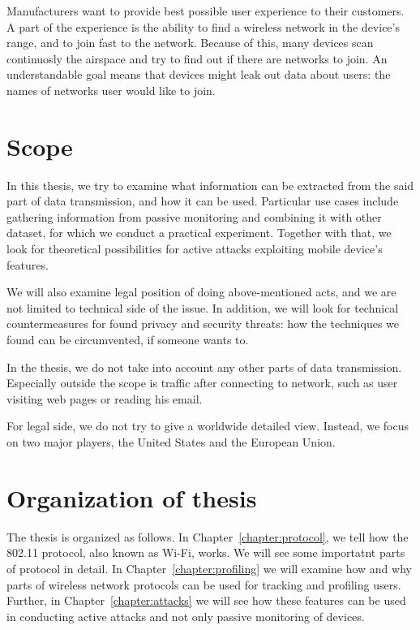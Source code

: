 \documentclass[12pt,a4paper,oneside,pdftex]{report}
\begin{document}
Manufacturers want to provide best possible user experience to their customers. A part of the experience is the ability to find a wireless network in the device's range, and to join fast to the network. Because of this, many devices scan continuosly the airspace and try to find out if there are networks to join. An understandable goal means that devices might leak out data about users: the names of networks user would like to join.


\section{Scope}
\label{sec:scope}

In this thesis, we try to examine what information can be extracted from the said part of data transmission, and how it can be used. Particular use cases include gathering information from passive monitoring and combining it with other dataset, for which we conduct a practical experiment. Together with that, we look for theoretical possibilities for active attacks exploiting mobile device's features.

We will also examine legal position of doing above-mentioned acts, and we are not limited to technical side of the issue. In addition, we will look for technical countermeasures for found privacy and security threats: how the techniques we found can be circumvented, if someone wants to. 

In the thesis, we do not take into account any other parts of data transmission. Especially outside the scope is traffic after connecting to network, such as user visiting web pages or reading his email.

For legal side, we do not try to give a worldwide detailed view. Instead, we focus on two major players, the United States and the European Union.

\section{Organization of thesis}

The thesis is organized as follows. In Chapter~\ref{chapter:protocol}, we tell how the 802.11 protocol, also known as Wi-Fi, works. We will see some importatnt parts of protocol in detail. In Chapter~\ref{chapter:profiling} we will examine how and why parts of wireless network protocols can be used for tracking and profiling users. Further, in Chapter~\ref{chapter:attacks} we will see how these features can be used in conducting active attacks and not only passive monitoring of devices. 
\end{document}
